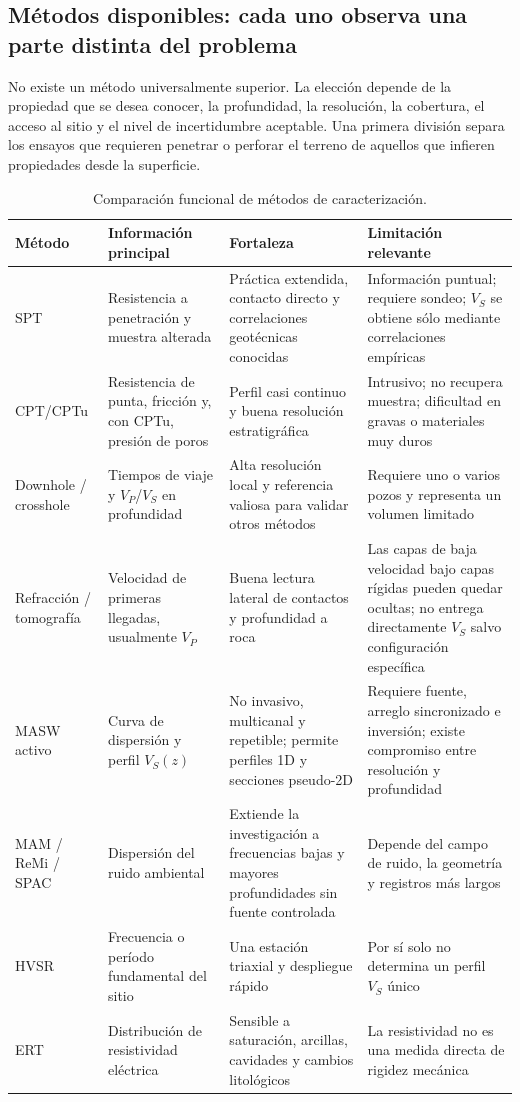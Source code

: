 \subsection{Métodos disponibles: cada uno observa una parte distinta del problema}

No existe un método universalmente superior. La elección depende de la propiedad que
se desea conocer, la profundidad, la resolución, la cobertura, el acceso al sitio y el
nivel de incertidumbre aceptable. Una primera división separa los ensayos que requieren
penetrar o perforar el terreno de aquellos que infieren propiedades desde la superficie.

\begin{table}[ht]
\centering
\footnotesize
\caption{Comparación funcional de métodos de caracterización.}
\begin{tabularx}{\textwidth}{@{}>{\raggedright\arraybackslash}p{} >{\raggedright\arraybackslash}p{} Y Y@{}}
\toprule
\textbf{Método} & \textbf{Información principal} & \textbf{Fortaleza} & \textbf{Limitación relevante} \\
\midrule
SPT & Resistencia a penetración y muestra alterada & Práctica extendida, contacto directo y correlaciones geotécnicas conocidas & Información puntual; requiere sondeo; $V_S$ se obtiene sólo mediante correlaciones empíricas \\
CPT/CPTu & Resistencia de punta, fricción y, con CPTu, presión de poros & Perfil casi continuo y buena resolución estratigráfica & Intrusivo; no recupera muestra; dificultad en gravas o materiales muy duros \\
Downhole / crosshole & Tiempos de viaje y $V_P$/$V_S$ en profundidad & Alta resolución local y referencia valiosa para validar otros métodos & Requiere uno o varios pozos y representa un volumen limitado \\
Refracción / tomografía & Velocidad de primeras llegadas, usualmente $V_P$ & Buena lectura lateral de contactos y profundidad a roca & Las capas de baja velocidad bajo capas rígidas pueden quedar ocultas; no entrega directamente $V_S$ salvo configuración específica \\
MASW activo & Curva de dispersión y perfil $V_S(z)$ & No invasivo, multicanal y repetible; permite perfiles 1D y secciones pseudo-2D & Requiere fuente, arreglo sincronizado e inversión; existe compromiso entre resolución y profundidad \\
MAM / ReMi / SPAC & Dispersión del ruido ambiental & Extiende la investigación a frecuencias bajas y mayores profundidades sin fuente controlada & Depende del campo de ruido, la geometría y registros más largos \\
HVSR & Frecuencia o período fundamental del sitio & Una estación triaxial y despliegue rápido & Por sí solo no determina un perfil $V_S$ único \\
ERT & Distribución de resistividad eléctrica & Sensible a saturación, arcillas, cavidades y cambios litológicos & La resistividad no es una medida directa de rigidez mecánica \\
\bottomrule
\end{tabularx}
\end{table}


